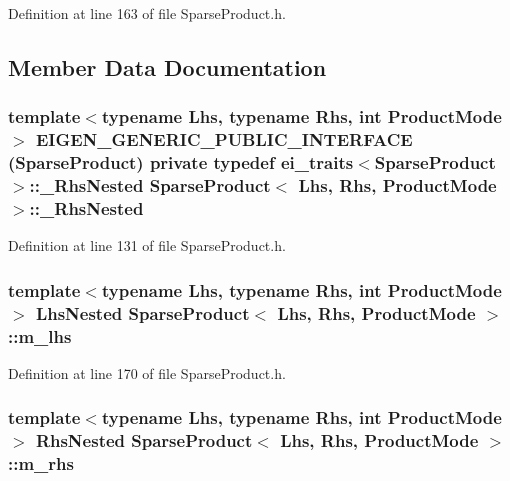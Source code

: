 Definition at line 163 of file Sparse\-Product.\-h.



\subsection{Member Data Documentation}
\hypertarget{class_sparse_product_a7141181a40741a5edf265e18053b5d92}{
\subsubsection[{\-\_\-\-Rhs\-Nested}]{\setlength{\rightskip}{0pt plus 5cm}template$<$typename Lhs, typename Rhs, int Product\-Mode$>$ E\-I\-G\-E\-N\-\_\-\-G\-E\-N\-E\-R\-I\-C\-\_\-\-P\-U\-B\-L\-I\-C\-\_\-\-I\-N\-T\-E\-R\-F\-A\-C\-E ({\bf Sparse\-Product}) private typedef {\bf ei\-\_\-traits}$<${\bf Sparse\-Product}$>$\-::\-\_\-\-Rhs\-Nested {\bf Sparse\-Product}$<$ Lhs, Rhs, Product\-Mode $>$\-::\-\_\-\-Rhs\-Nested}}\label{class_sparse_product_a7141181a40741a5edf265e18053b5d92}


Definition at line 131 of file Sparse\-Product.\-h.

\hypertarget{class_sparse_product_a48ebd9deb893d47b6b8a837c5a8dd5c0}{
\subsubsection[{m\-\_\-lhs}]{\setlength{\rightskip}{0pt plus 5cm}template$<$typename Lhs, typename Rhs, int Product\-Mode$>$ Lhs\-Nested {\bf Sparse\-Product}$<$ Lhs, Rhs, Product\-Mode $>$\-::m\-\_\-lhs\hspace{0.3cm}{\ttfamily [protected]}}}\label{class_sparse_product_a48ebd9deb893d47b6b8a837c5a8dd5c0}


Definition at line 170 of file Sparse\-Product.\-h.

\hypertarget{class_sparse_product_a2129c7e922f18df965c7aa2b07c24b60}{
\subsubsection[{m\-\_\-rhs}]{\setlength{\rightskip}{0pt plus 5cm}template$<$typename Lhs, typename Rhs, int Product\-Mode$>$ Rhs\-Nested {\bf Sparse\-Product}$<$ Lhs, Rhs, Product\-Mode $>$\-::m\-\_\-rhs\hspace{0.3cm}{\ttfamily [protected]}}}\label{class_sparse_product_a2129c7e922f18df965c7aa2b07c24b60}


